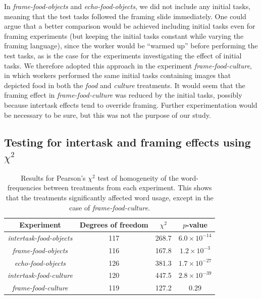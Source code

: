 \documentclass[12pt]{article}
\begin{document}
In \textit{frame-food-objects} and \textit{echo-food-objects}, we did not
include any initial tasks, meaning that the test tasks followed the framing
slide immediately.  One could argue that a better comparison would be achieved
including initial tasks even for framing experiments (but keeping the
initial tasks constant while varying the framing language), since the worker
would be ``warmed up'' before performing the test tasks, as is the case for
the experiments investigating the effect of initial tasks. 
We therefore adopted this approach in the experiment 
\textit{frame-food-culture}, in which workers performed the same 
initial tasks containing images that depicted food in both the \textit{food}
and \textit{culture} treatments.  It would seem that the framing effect in 
\textit{frame-food-culture} was reduced by the initial tasks, possibly because
intertask effects tend to override framing. Further experimentation 
would be necessary to be sure, but this was not the purpose of our study.

\subsection*{Testing for intertask and framing effects using $\chi^2$}

\begin{table}
\centering
\begin{tabular}{c c c c}
\toprule
Experiment & Degrees of freedom & $\chi^2$ & $p$-value\\
\toprule
\textit{intertask-food-objects} & 117 & 268.7 & $6.0 \times 10^{-14}$\\
\textit{frame-food-objects} & 116 & 167.8 & $1.2 \times 10^{-3}$\\
\textit{echo-food-objects} & 126 & 381.3 & $1.7 \times 10^{-27}$\\
\textit{intertask-food-culture} & 120 & 447.5 & $2.8 \times 10^{-39}$\\
\textit{frame-food-culture} & 119 & 127.2 & $0.29$\\
\bottomrule
\end{tabular}
\caption{
	Results for Pearson's $\chi^2$ test of homogeneity of the word-frequencies
	between treatments from each experiment.  This shows that the treatments
	significantly affected word usage, 
	except in the case of \textit{frame-food-culture}.
}
\label{table:chi2}
\end{table}
\end{document}
